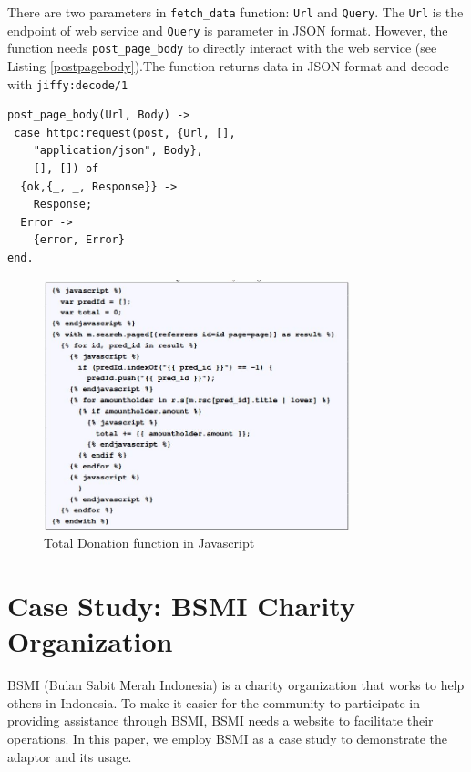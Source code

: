 \documentclass[conference]{IEEEtran}
\begin{document}

There are two parameters in \texttt{fetch\_data} function: \texttt{Url} and \texttt{Query}. The \texttt{Url} is the endpoint of web service and \texttt{Query} is parameter in JSON format. However, the function needs \texttt{post\_page\_body} to directly interact with the web service (see Listing \ref{postpagebody}).The function returns data in JSON format and decode with \texttt{jiffy:decode/1} 

\begin{lstlisting}[caption=Implementation of post\_page\_body function, label=postpagebody]
post_page_body(Url, Body) ->
 case httpc:request(post, {Url, [], 
    "application/json", Body},
    [], []) of
  {ok,{_, _, Response}} ->
    Response;
  Error ->
    {error, Error}
end.
\end{lstlisting} 

\begin{figure}[h]
\centering
\includegraphics[width=3.5in]{totaldonationjs}

\caption{Total Donation function in Javascript}
\label{samplejs}
\end{figure}


\section{Case Study: BSMI Charity Organization} \label{casestudy}

BSMI (Bulan Sabit Merah Indonesia) is a charity organization that works to help others in Indonesia. To make it easier for the community to participate in providing assistance through BSMI, BSMI needs a website to facilitate their operations. In this paper, we employ BSMI as a case study to demonstrate the adaptor and its usage. 
\end{document}
